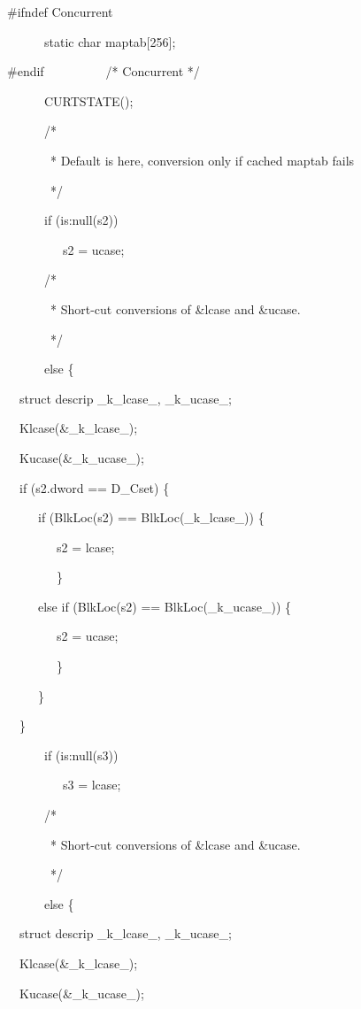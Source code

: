 {\ttfamily\mdseries
\#ifndef Concurrent}

{\ttfamily\mdseries
\ \ \ \ \ \ static char maptab[256];}

{\ttfamily\mdseries
\#endif\ \ \ \ \ \ \ \ \ \ /* Concurrent */}

{\ttfamily\mdseries
\ \ \ \ \ \ CURTSTATE();}


\ \ \ \ \ \ /*


\ \ \ \ \ \ \ * Default is here, conversion only if cached maptab fails


\ \ \ \ \ \ \ */


\ \ \ \ \ \ if (is:null(s2))


\ \ \ \ \ \ \ \ \ s2 = ucase;


\ \ \ \ \ \ /*


\ \ \ \ \ \ \ * Short-cut conversions of \&lcase and \&ucase.


\ \ \ \ \ \ \ */


\ \ \ \ \ \ else \{


\ \  struct descrip \_k\_lcase\_, \_k\_ucase\_;


\ \  Klcase(\&\_k\_lcase\_);


\ \  Kucase(\&\_k\_ucase\_);


\ \  if (s2.dword == D\_Cset) \{


\ \  \ \ \ if (BlkLoc(s2) == BlkLoc(\_k\_lcase\_)) \{


\ \  \ \ \ \ \ \ s2 = lcase;


\ \  \ \ \ \ \ \ \}


\ \  \ \ \ else if (BlkLoc(s2) == BlkLoc(\_k\_ucase\_)) \{


\ \  \ \ \ \ \ \ s2 = ucase;


\ \  \ \ \ \ \ \ \}


\ \  \ \ \ \}


\ \  \}


\bigskip


\ \ \ \ \ \ if (is:null(s3))


\ \ \ \ \ \ \ \ \ s3 = lcase;


\ \ \ \ \ \ /*


\ \ \ \ \ \ \ * Short-cut conversions of \&lcase and \&ucase.


\ \ \ \ \ \ \ */


\ \ \ \ \ \ else \{


\ \  struct descrip \_k\_lcase\_, \_k\_ucase\_;


\ \  Klcase(\&\_k\_lcase\_);


\ \  Kucase(\&\_k\_ucase\_);


